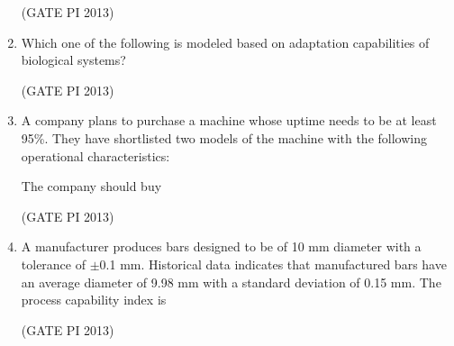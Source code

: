 \documentclass[journal,12pt,onecolumn]{IEEEtran}
\theoremstyle{remark}
\begin{document}
\begin{enumerate}
\hfill (GATE PI 2013)

\item Which one of the following is modeled based on adaptation capabilities of biological systems? 

\begin{enumerate}
\end{enumerate}

\hfill (GATE PI 2013)

\item A company plans to purchase a machine whose uptime needs to be at least 95\%. They have shortlisted two models of the machine with the following operational characteristics: 

\medskip


The company should buy
\begin{enumerate}
\end{enumerate}

\hfill (GATE PI 2013)

\item A manufacturer produces bars designed to be of 10 mm diameter with a tolerance of $\pm$0.1 mm. Historical data indicates that manufactured bars have an average diameter of 9.98 mm with a standard deviation of 0.15 mm. The process capability index is
\begin{enumerate}
\end{enumerate}

\hfill (GATE PI 2013)


\end{enumerate}
\end{document}
